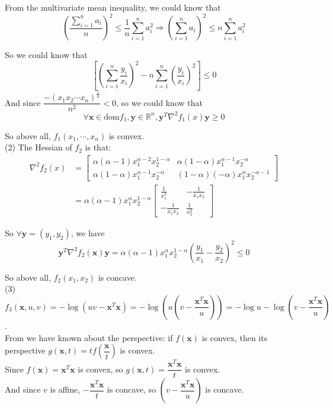 \documentclass[10pt]{article}
\renewcommand{\mathbf}{\boldsymbol}
\begin{document}
\begin{enumerate}
From the multivariate mean inequality, we could know that
$$\left(\dfrac{\sum_{i=1}^na_i}{n}\right)^2\leq \dfrac{1}{n}\sum_{i=1}^na_i^2 \Rightarrow \left(\sum_{i=1}^na_i\right)^2\leq n\sum_{i=1}^na_i^2$$

So we could know that 
$$\left[\left(\sum_{i=1}^n\dfrac{y_i}{x_i}\right)^2-n\sum_{i=1}^n\left(\dfrac{y_i}{x_i}\right)^2\right]\leq 0$$
And since $\dfrac{-(x_1x_2\cdots x_n)^{\frac{1}{n}}}{n^2}<0$, so we could know that
$$\forall\mathbf{x}\in\text{dom} f_1,\mathbf{y}\in\mathbb{R}^n, \mathbf{y}^T\nabla^2 f_1(x)\mathbf{y}\geq 0$$

So above all, $f_1(x_1,\cdots,x_n)$ is convex.\\


(2) The Hessian of $f_2$ is that:
\begin{align*}
\nabla^2 f_2(x) & =\left[\begin{array}{cc}
\alpha(\alpha-1) x_1^{\alpha-2} x_2^{1-\alpha} & \alpha(1-\alpha) x_1^{\alpha-1} x_2^{-\alpha} \\
\alpha(1-\alpha) x_1^{\alpha-1} x_2^{-\alpha} & (1-\alpha)(-\alpha) x_1^\alpha x_2^{-\alpha-1}
\end{array}\right] \\
& =\alpha(\alpha-1) x_1^\alpha x_2^{1-\alpha}
\left[\begin{array}{cc}
\frac{1}{x_1^2} & -\frac{1}{x_1x_2} \\
-\frac{1}{x_1x_2} & \frac{1}{x_2^2}
\end{array}\right]
\end{align*}

So $\forall\mathbf{y}=(y_1,y_2)$, we have
$$\mathbf{y}^T\nabla^2f_2(\mathbf{x})\mathbf{y}=\alpha(\alpha-1) x_1^\alpha x_2^{1-\alpha}\left(\dfrac{y_1}{x_1}-\dfrac{y_2}{x_2}\right)^2\leq 0$$

So above all, $f_2(x_1,x_2)$ is concave.\\


(3) $f_3(\mathbf{x}, u, v)=-\log(uv-\mathbf{x}^T\mathbf{x})=-\log\left(u(v-\dfrac{\mathbf{x}^T\mathbf{x}}{u})\right)=-\log u-\log \left(v-\dfrac{\mathbf{x}^T\mathbf{x}}{u}\right)$.\\
From we have known about the perspective: if $f(\mathbf{x})$ is convex, then its perspective $g(\mathbf{x},t)=tf\left(\dfrac{\mathbf{x}}{t}\right)$ is convex.\\
Since $f(\mathbf{x})=\mathbf{x}^T\mathbf{x}$ is convex, so $g(\mathbf{x},t)=\dfrac{\mathbf{x}^T\mathbf{x}}{t}$ is convex.\\
And since $v$ is affine, $-\dfrac{\mathbf{x}^T\mathbf{x}}{t}$ is concave, so $\left(v-\dfrac{\mathbf{x}^T\mathbf{x}}{u}\right)$ is concave.\\


\end{enumerate}
\end{document}
